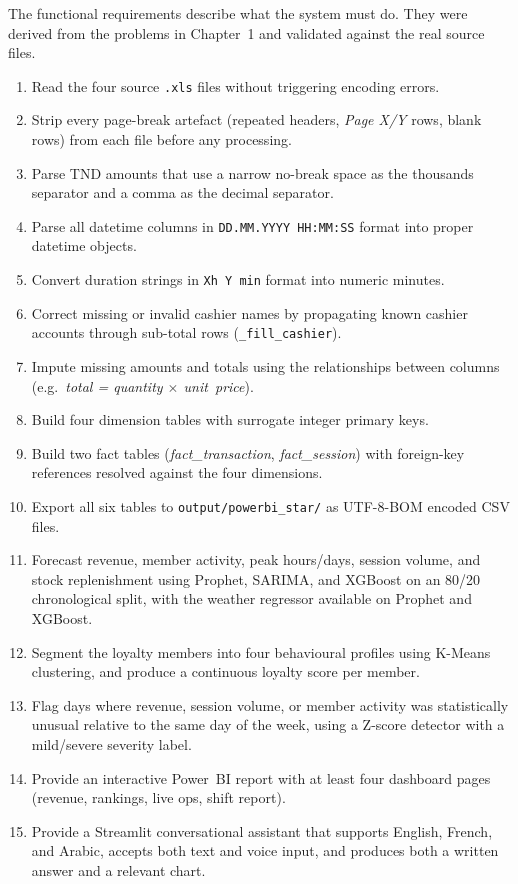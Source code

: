 \documentclass[12pt, a4paper]{report}
\begin{document}
The functional requirements describe what the system must do. They were
derived from the problems in Chapter~1 and validated against the real source
files.

\begin{enumerate}
  \item Read the four source \texttt{.xls} files without triggering encoding
        errors.
  \item Strip every page-break artefact (repeated headers, \textit{Page X/Y}
        rows, blank rows) from each file before any processing.
  \item Parse TND amounts that use a narrow no-break space as the thousands
        separator and a comma as the decimal separator.
  \item Parse all datetime columns in \texttt{DD.MM.YYYY~HH:MM:SS} format
        into proper datetime objects.
  \item Convert duration strings in \texttt{Xh~Y~min} format into numeric
        minutes.
  \item Correct missing or invalid cashier names by propagating known cashier
        accounts through sub-total rows (\texttt{\_fill\_cashier}).
  \item Impute missing amounts and totals using the relationships between
        columns (e.g.\ \textit{total = quantity $\times$ unit~price}).
  \item Build four dimension tables with surrogate integer primary keys.
  \item Build two fact tables (\textit{fact\_transaction}, \textit{fact\_session})
        with foreign-key references resolved against the four dimensions.
  \item Export all six tables to \texttt{output/powerbi\_star/} as UTF-8-BOM
        encoded CSV files.
  \item Forecast revenue, member activity, peak hours/days, session volume,
        and stock replenishment using Prophet, SARIMA, and XGBoost on an
        80/20 chronological split, with the weather regressor available
        on Prophet and XGBoost.
  \item Segment the loyalty members into four behavioural profiles using
        K-Means clustering, and produce a continuous loyalty score per member.
  \item Flag days where revenue, session volume, or member activity was
        statistically unusual relative to the same day of the week, using a
        Z-score detector with a mild/severe severity label.
  \item Provide an interactive Power~BI report with at least four dashboard
        pages (revenue, rankings, live ops, shift report).
  \item Provide a Streamlit conversational assistant that supports English,
        French, and Arabic, accepts both text and voice input, and produces
        both a written answer and a relevant chart.
\end{enumerate}
\end{document}
